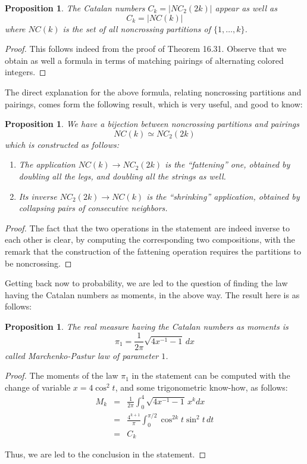\documentclass[12pt]{amsbook}
\newtheorem{proposition}[theorem]{Proposition}
\begin{document}
\begin{proposition}
The Catalan numbers $C_k=|NC_2(2k)|$ appear as well as
$$C_k=|NC(k)|$$
where $NC(k)$ is the set of all noncrossing partitions of $\{1,\ldots,k\}$.
\end{proposition}

\begin{proof}
This follows indeed from the proof of Theorem 16.31. Observe that we obtain as well a formula in terms of matching pairings of alternating colored integers.
\end{proof}

The direct explanation for the above formula, relating noncrossing partitions and pairings, comes form the following result, which is very useful, and good to know:

\begin{proposition}
We have a bijection between noncrossing partitions and pairings
$$NC(k)\simeq NC_2(2k)$$
which is constructed as follows:
\begin{enumerate}
\item The application $NC(k)\to NC_2(2k)$ is the ``fattening'' one, obtained by doubling all the legs, and doubling all the strings as well.

\item Its inverse $NC_2(2k)\to NC(k)$ is the ``shrinking'' application, obtained by collapsing pairs of consecutive neighbors.
\end{enumerate}
\end{proposition}

\begin{proof}
The fact that the two operations in the statement are indeed inverse to each other is clear, by computing the corresponding two compositions, with the remark that the construction of the fattening operation requires the partitions to be noncrossing.
\end{proof}

Getting back now to probability, we are led to the question of finding the law having the Catalan numbers as moments, in the above way. The result here is as follows:

\begin{proposition}
The real measure having the Catalan numbers as moments is
$$\pi_1=\frac{1}{2\pi}\sqrt{4x^{-1}-1}\,dx$$
called Marchenko-Pastur law of parameter $1$.
\end{proposition}

\begin{proof}
The moments of the law $\pi_1$ in the statement can be computed with the change of variable $x=4\cos^2t$, and some trigonometric know-how, as follows:
\begin{eqnarray*}
M_k
&=&\frac{1}{2\pi}\int_0^4\sqrt{4x^{-1}-1}\,x^kdx\\
&=&\frac{4^{k+1}}{\pi}\int_0^{\pi/2}\cos^{2k}t\sin^2t\,dt\\
&=&C_k
\end{eqnarray*}

Thus, we are led to the conclusion in the statement.
\end{proof}
\end{document}
